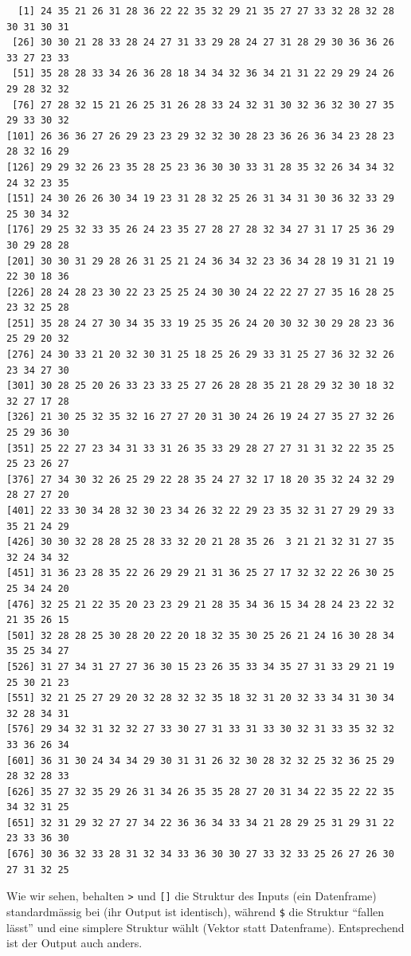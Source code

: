 \documentclass[
  letterpaper,
  DIV=11,
  numbers=noendperiod]{scrreprt}
\begin{document}
\begin{verbatim}
  [1] 24 35 21 26 31 28 36 22 22 35 32 29 21 35 27 27 33 32 28 32 28 30 31 30 31
 [26] 30 30 21 28 33 28 24 27 31 33 29 28 24 27 31 28 29 30 36 36 26 33 27 23 33
 [51] 35 28 28 33 34 26 36 28 18 34 34 32 36 34 21 31 22 29 29 24 26 29 28 32 32
 [76] 27 28 32 15 21 26 25 31 26 28 33 24 32 31 30 32 36 32 30 27 35 29 33 30 32
[101] 26 36 36 27 26 29 23 23 29 32 32 30 28 23 36 26 36 34 23 28 23 28 32 16 29
[126] 29 29 32 26 23 35 28 25 23 36 30 30 33 31 28 35 32 26 34 34 32 24 32 23 35
[151] 24 30 26 26 30 34 19 23 31 28 32 25 26 31 34 31 30 36 32 33 29 25 30 34 32
[176] 29 25 32 33 35 26 24 23 35 27 28 27 28 32 34 27 31 17 25 36 29 30 29 28 28
[201] 30 30 31 29 28 26 31 25 21 24 36 34 32 23 36 34 28 19 31 21 19 22 30 18 36
[226] 28 24 28 23 30 22 23 25 25 24 30 30 24 22 22 27 27 35 16 28 25 23 32 25 28
[251] 35 28 24 27 30 34 35 33 19 25 35 26 24 20 30 32 30 29 28 23 36 25 29 20 32
[276] 24 30 33 21 20 32 30 31 25 18 25 26 29 33 31 25 27 36 32 32 26 23 34 27 30
[301] 30 28 25 20 26 33 23 33 25 27 26 28 28 35 21 28 29 32 30 18 32 32 27 17 28
[326] 21 30 25 32 35 32 16 27 27 20 31 30 24 26 19 24 27 35 27 32 26 25 29 36 30
[351] 25 22 27 23 34 31 33 31 26 35 33 29 28 27 27 31 31 32 22 35 25 25 23 26 27
[376] 27 34 30 32 26 25 29 22 28 35 24 27 32 17 18 20 35 32 24 32 29 28 27 27 20
[401] 22 33 30 34 28 32 30 23 34 26 32 22 29 23 35 32 31 27 29 29 33 35 21 24 29
[426] 30 30 32 28 28 25 28 33 32 20 21 28 35 26  3 21 21 32 31 27 35 32 24 34 32
[451] 31 36 23 28 35 22 26 29 29 21 31 36 25 27 17 32 32 22 26 30 25 25 34 24 20
[476] 32 25 21 22 35 20 23 23 29 21 28 35 34 36 15 34 28 24 23 22 32 21 35 26 15
[501] 32 28 28 25 30 28 20 22 20 18 32 35 30 25 26 21 24 16 30 28 34 35 25 34 27
[526] 31 27 34 31 27 27 36 30 15 23 26 35 33 34 35 27 31 33 29 21 19 25 30 21 23
[551] 32 21 25 27 29 20 32 28 32 32 35 18 32 31 20 32 33 34 31 30 34 32 28 34 31
[576] 29 34 32 31 32 32 27 33 30 27 31 33 31 33 30 32 31 33 35 32 32 33 36 26 34
[601] 36 31 30 24 34 34 29 30 31 31 26 32 30 28 32 32 25 32 36 25 29 28 32 28 33
[626] 35 27 32 35 29 26 31 34 26 35 35 28 27 20 31 34 22 35 22 22 35 34 32 31 25
[651] 32 31 29 32 27 27 34 22 36 36 34 33 34 21 28 29 25 31 29 31 22 23 33 36 30
[676] 30 36 32 33 28 31 32 34 33 36 30 30 27 33 32 33 25 26 27 26 30 27 31 32 25
\end{verbatim}

Wie wir sehen, behalten \texttt{\textbar{}\textgreater{}} und
\texttt{{[}{]}} die Struktur des Inputs (ein Datenframe) standardmässig
bei (ihr Output ist identisch), während \texttt{\$} die Struktur
``fallen lässt'' und eine simplere Struktur wählt (Vektor statt
Datenframe). Entsprechend ist der Output auch anders.
\end{document}
